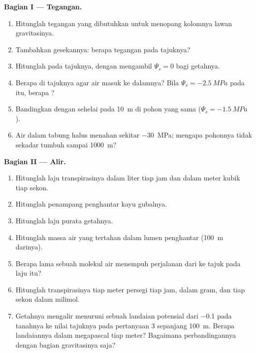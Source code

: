 \begin{problem}
\medskip
\noindent\textbf{Bagian I --- Tegangan.}
\begin{enumerate}
  \item Hitunglah tegangan yang dibutuhkan untuk menopang kolomnya
        lawan gravitasinya.
  \item Tambahkan gesekannya: berapa tegangan  pada tajuknya?
  \item Hitunglah   pada tajuknya, dengan mengambil
        $\Psi_s = 0$ bagi getahnya.
  \item Berapa    di tajuknya agar air masuk ke
        dalamnya? Bila $\Psi_s = \qty{-2.5}{MPa}$ pada  itu, berapa
        ?
  \item Bandingkan dengan sehelai  pada \qty{10}{m} di pohon yang sama ($\Psi_s =
        \qty{-1.5}{MPa}$).
  \item Air dalam tabung halus menahan sekitar \qty{-30}{MPa}; mengapa
        pohonnya tidak sekadar tumbuh sampai \qty{1000}{m}?
\end{enumerate}

\medskip
\noindent\textbf{Bagian II --- Alir.}
\begin{enumerate}[resume]
  \item Hitunglah laju transpirasinya dalam liter tiap jam dan dalam
        meter kubik tiap sekon.
  \item Hitunglah penampang penghantar kayu gubalnya.
  \item Hitunglah laju purata getahnya.
  \item Hitunglah massa air yang tertahan dalam lumen penghantar
         (\qty{100}{m} darinya).
  \item Berapa lama sebuah molekul air menempuh perjalanan dari  ke
        tajuk pada laju itu?
  \item Hitunglah transpirasinya tiap meter persegi  tiap jam,
        dalam gram, dan tiap sekon dalam milimol.
  \item Getahnya mengalir menuruni sebuah landaian potensial dari
        \qty{-0.1}{} pada tanahnya ke nilai tajuknya pada pertanyaan 3
        sepanjang \qty{100}{m}. Berapa landaiannya dalam megapascal
        tiap meter? Bagaimana perbandingannya dengan bagian
        gravitasinya saja?
\end{enumerate}


\end{problem}

